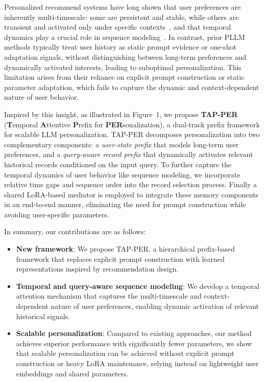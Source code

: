 \documentclass[11pt]{article}
\begin{document}
Personalized recommend systems have long shown that user preferences are inherently multi-timescale: some are persistent and stable, while others are transient and activated only under specific contexts~\cite{zhou2018deep,sun2020go}, and that temporal dynamics play a crucial role in sequence modeling~\cite{li2020time}. In contrast, prior PLLM methods typically treat user history as static prompt evidence or one-shot adaptation signals, without distinguishing between long-term preferences and dynamically activated interests, leading to suboptimal personalization. This limitation arises from their reliance on explicit prompt construction or static parameter adaptation, which fails to capture the dynamic and context-dependent nature of user behavior.

Inspired by this insight, as illustrated in Figure~1, we propose \textbf{TAP-PER} (\textbf{T}emporal \textbf{A}ttentive \textbf{P}refix for \textbf{PER}sonalization), a dual-track prefix framework for scalable LLM personalization. TAP-PER decomposes personalization into two complementary components: a \emph{user-state prefix} that models long-term user preferences, and a \emph{query-aware record prefix} that dynamically activates relevant historical records conditioned on the input query. To further capture the temporal dynamics of user behavior like sequence modeling, we incorporate relative time gaps and sequence order into the record selection process. Finally a shared LoRA-based mediator is employed to integrate these memory components in an end-to-end manner, eliminating the need for prompt construction while avoiding user-specific parameters.

In summary, our contributions are as follows:
\begin{itemize}
    \setlength{\itemsep}{0pt}
    \setlength{\topsep}{0pt}
    \setlength{\parsep}{0pt}
\item \textbf{New framework}: 
We propose TAP-PER, a hierarchical prefix-based framework that replaces explicit prompt construction with learned representations inspired by recommendation design.

\item \textbf{Temporal and query-aware sequence modeling}: 
We develop a temporal attention mechanism that captures the multi-timescale and context-dependent nature of user preferences, enabling dynamic activation of relevant historical signals.

\item \textbf{Scalable personalization}: 
Compared to existing approaches, our method achieves superior performance with significantly fewer parameters, we show that scalable personalization can be achieved without explicit prompt construction or heavy LoRA maintenance, relying instead on lightweight user embeddings and shared parameters.
\end{itemize}
\end{document}

